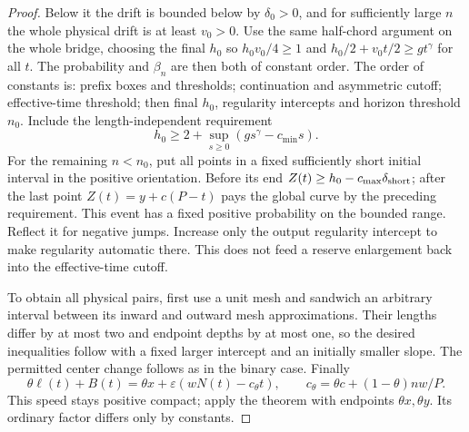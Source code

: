 \begin{proof}
Below it the drift is bounded below by $\delta_0>0$, and for
sufficiently large $n$ the whole physical drift is at least $v_0>0$.
Use the same half-chord argument on the whole bridge, choosing the
final $h_0$ so
$h_0v_0/4\ge1$ and $h_0/2+v_0t/2\ge gt^\gamma$ for all $t$.
The probability and $\beta_n$ are then both of constant order.
The order of constants is: prefix boxes and thresholds; continuation
and asymmetric cutoff; effective-time threshold; then final $h_0$,
regularity intercepts and horizon threshold $n_0$. Include the
length-independent requirement
\[
 h_0\ge2+\sup_{s\ge0}(gs^\gamma-c_{\min}s).
\]
For the remaining $n<n_0$, put all points in a fixed sufficiently
short initial interval in the positive orientation. Before its end
$Z(t)\ge h_0-c_{\max}\delta_{\rm short}$; after the last point
$Z(t)=y+c(P-t)$ pays the global curve by the preceding requirement.
This event has a fixed positive probability on the bounded range.
Reflect it for negative jumps. Increase only the output regularity
intercept to make regularity automatic there. This does not feed
a reserve enlargement back into the effective-time cutoff.

To obtain all physical pairs, first use a unit mesh and sandwich an
arbitrary interval between its inward and outward mesh approximations.
Their lengths differ by at most two and endpoint depths by at most
one, so the desired inequalities follow with a fixed larger intercept
and an initially smaller slope. The permitted center change follows
as in the binary case. Finally
\[
 \theta\ell(t)+B(t)=\theta x+\varepsilon(wN(t)-c_\theta t),
 \qquad c_\theta=\theta c+(1-\theta)nw/P.
\]
This speed stays positive compact; apply the theorem with endpoints
$\theta x,\theta y$. Its ordinary factor differs only by constants.
\end{proof}

